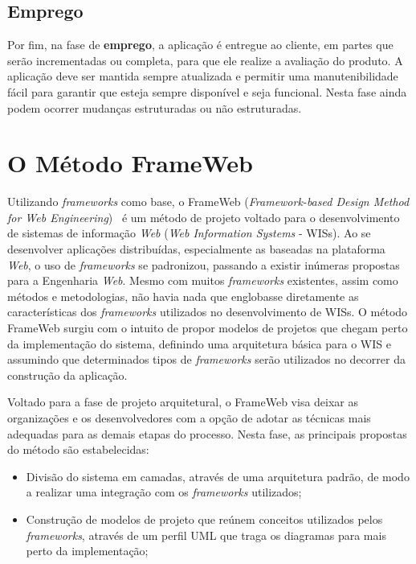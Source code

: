 \subsection{Emprego}
\label{sec-ref-emprego}

Por fim, na fase de \textbf{emprego}, a aplicação é entregue ao cliente, em partes que serão incrementadas ou completa, para que ele realize a avaliação do produto. A aplicação deve ser mantida sempre atualizada e permitir uma manutenibilidade fácil para garantir que esteja sempre disponível e seja funcional. Nesta fase ainda podem ocorrer mudanças estruturadas ou não estruturadas.

\section{O Método FrameWeb}
\label{sec-ref-frameweb}

Utilizando \textit{frameworks} como base, o FrameWeb (\textit{Framework-based Design Method for Web Engineering})~ é um método de projeto voltado para o desenvolvimento de sistemas de informação \textit{Web} (\textit{Web Information Systems} - WISs). Ao se desenvolver aplicações distribuídas, especialmente as baseadas na plataforma \textit{Web}, o uso de \textit{frameworks} se padronizou, passando a existir inúmeras propostas para a Engenharia \textit{Web}. Mesmo com muitos \textit{frameworks} existentes, assim como métodos e metodologias, não havia nada que englobasse diretamente as características dos \textit{frameworks} utilizados no desenvolvimento de WISs. O método FrameWeb surgiu com o intuito de propor modelos de projetos que chegam perto da implementação do sistema, definindo uma arquitetura básica para o WIS e assumindo que determinados tipos de \textit{frameworks} serão utilizados no decorrer da construção da aplicação.

Voltado para a fase de projeto arquitetural, o FrameWeb visa deixar as organizações e os desenvolvedores com a opção de adotar as técnicas mais adequadas para as demais etapas do processo. Nesta fase, as principais propostas do método são estabelecidas:
  
\begin{itemize}
	
	\item Divisão do sistema em camadas, através de uma arquitetura padrão, de modo a realizar uma integração com os \textit{frameworks} utilizados;
	
	\item Construção de modelos de projeto que reúnem conceitos utilizados pelos \textit{frameworks}, através de um perfil UML que traga os diagramas para mais perto da implementação;

\end{itemize}

